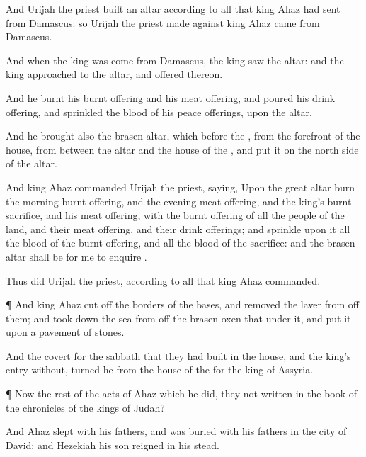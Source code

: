 {And
Urijah the
priest
built an
altar according to all that
king
Ahaz had
sent from
Damascus: so
Urijah the
priest
made
{} against
king
Ahaz
came from
Damascus.

And when the
king was
come from
Damascus, the
king
saw the
altar: and the
king
approached to the
altar, and
offered thereon.

And he
burnt his burnt
offering and his meat
offering, and
poured his drink
offering, and
sprinkled the
blood of his peace
offerings, upon the
altar.

And he
brought also the
brasen
altar, which
{}
before the
{}, from the
forefront of the
house, from between the
altar and the
house of the
{}, and
put it on the
north
side of the
altar.

And
king
Ahaz
commanded
Urijah the
priest,
saying, Upon the
great
altar
burn the
morning burnt
offering, and the
evening meat
offering, and the
king’s burnt
sacrifice, and his meat
offering, with the burnt
offering of all the
people of the
land, and their meat
offering, and their drink
offerings; and
sprinkle upon it all the
blood of the burnt
offering, and all the
blood of the
sacrifice: and the
brasen
altar shall be for me to
enquire
{}.

Thus
did
Urijah the
priest, according to all that
king
Ahaz
commanded.


\par }{\PP {}¶ And
king
Ahaz cut
off the
borders of the
bases, and
removed the
laver from off them; and took
down the
sea from off the
brasen
oxen that
{} under it, and
put it upon a
pavement of
stones.

And the
covert for the
sabbath that they had
built in the
house, and the
king’s
entry
without,
turned he from the
house of the
{}
for the
king of
Assyria.


\par }{\PP {}¶ Now the
rest of the
acts of
Ahaz which he
did,
{} they not
written in the
book of the
chronicles of the
kings of
Judah?

And
Ahaz
slept with his
fathers, and was
buried with his
fathers in the
city of
David: and
Hezekiah his
son
reigned in his stead.




\par }
